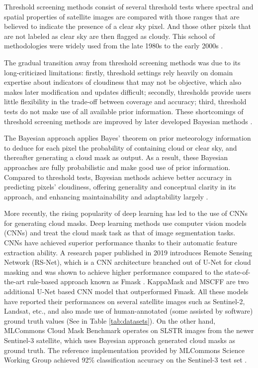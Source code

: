 \documentclass[sigplan,screen]{acmart}
\begin{document}
Threshold screening methods consist of several threshold tests where spectral and spatial properties of satellite images are compared with those ranges that are believed to indicate the presence of a clear sky pixel. And those other pixels that are not labeled as clear sky are then flagged as cloudy. This school of methodologies were widely used from the late 1980s to the early 2000s \cite{Merchant2005ProbabilisticPB}. 

The gradual transition away from threshold screening methods was due to its long-criticized limitations: firstly, threshold settings rely heavily on domain expertise about indicators of cloudiness that may not be objective, which also makes later modification and updates difficult; secondly, thresholds provide users little flexibility in the trade-off between coverage and accuracy; third, threshold tests do not make use of all available prior information. These shortcomings of threshold screening methods are improved by later developed Bayesian methods \cite{Merchant2005ProbabilisticPB}.

The Bayesian approach applies Bayes' theorem on prior meteorology information to deduce for each pixel the probability of containing cloud or clear sky, and thereafter generating a cloud mask as output. As a result, these Bayesian approaches are fully probabilistic and make good use of prior information. Compared to threshold tests, Bayesian methods achieve better accuracy in predicting pixels' cloudiness, offering generality and conceptual clarity in its approach, and enhancing maintainability and adaptability largely \cite{Merchant2005ProbabilisticPB}. 

More recently, the rising popularity of deep learning has led to the use of CNNs for generating cloud masks. Deep learning methods \cite{Li2019DeepLB,Domnich2021KappaMaskAC,Yan2018CloudAC,WIELAND2019111203,JEPPESEN2019247} use computer vision models (CNNs) and treat the cloud mask task as that of image segmentation tasks. CNNs have achieved superior performance thanks to their automatic feature extraction ability. A research paper published in 2019 \cite{JEPPESEN2019247} introduces Remote Sensing Network (RS-Net), which is a CNN architecture branched out of U-Net \cite{RFB15a} for cloud masking and was shown to achieve higher performance compared to the state-of-the-art rule-based approach known as Fmask \cite{Zhu2012ObjectbasedCA}. KappaMask \cite{Domnich2021KappaMaskAC} and MSCFF \cite{Li2019DeepLB} are two additional U-Net based CNN model that outperformed Fmask. All these models have reported their performances on several satellite images such as Sentinel-2, Landsat, etc., and also made use of human-annotated (some assisted by software) ground truth values (See in Table \ref{tab:datasets}). On the other hand, MLCommons Cloud Mask Benchmark operates on SLSTR images from the newer Sentinel-3 satellite, which uses Bayesian approach generated cloud masks as ground truth. The reference implementation provided by MLCommons Science Working Group achieved 92\% classification accuracy on the Sentinel-3 test set \cite{Thiyagalingam2022AIBF}.
\end{document}
